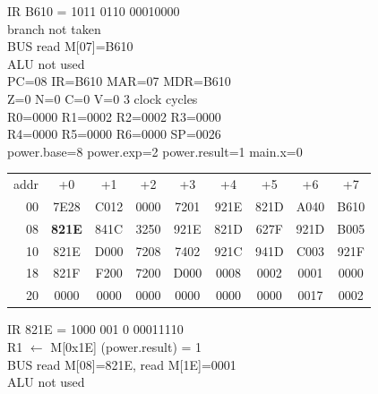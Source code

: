 \noindent\begin{tcolorbox}[stepbox, title={Step 12 \hfill PC 07 \quad BLE power.endwhile1}]
\textcolor{dim}{IR} B610 = 1011 0110 00010000\\
branch not taken\\
\textcolor{dim}{BUS} read M[07]=B610\\
\textcolor{dim}{ALU} \textcolor{dim}{not used}\\
PC=08 IR=B610 MAR=07 MDR=B610\\
Z=0 N=0 C=0 V=0 \hfill \textcolor{dim}{3 clock cycles}\\
R0=0000 R1=0002 R2=0002 R3=0000\\
R4=0000 R5=0000 R6=0000 SP=0026\\
\textcolor{dim}{power.base=8  power.exp=2  power.result=1  main.x=0}\\[1pt]
{\setlength{\tabcolsep}{1.6pt}\begin{tabular}{@{}r*{8}{c}@{}}
\textcolor{dim}{addr} & \textcolor{dim}{+0} & \textcolor{dim}{+1} & \textcolor{dim}{+2} & \textcolor{dim}{+3} & \textcolor{dim}{+4} & \textcolor{dim}{+5} & \textcolor{dim}{+6} & \textcolor{dim}{+7}\\
\textcolor{dim}{00} & 7E28 & C012 & 0000 & 7201 & 921E & 821D & A040 & B610\\
\textcolor{dim}{08} & \cellcolor{pcc}\textbf{821E} & 841C & 3250 & 921E & 821D & 627F & 921D & B005\\
\textcolor{dim}{10} & 821E & D000 & 7208 & 7402 & 921C & 941D & C003 & 921F\\
\textcolor{dim}{18} & 821F & F200 & 7200 & D000 & \cellcolor{datac}0008 & \cellcolor{datac}0002 & \cellcolor{datac}0001 & \cellcolor{datac}0000\\
\textcolor{dim}{20} & \cellcolor{stackc}0000 & \cellcolor{stackc}0000 & \cellcolor{stackc}0000 & \cellcolor{stackc}0000 & \cellcolor{stackc}0000 & \cellcolor{stackc}0000 & \cellcolor{stackc}0017 & \cellcolor{stackc}0002\\
\end{tabular}}
\end{tcolorbox}\hfill\begin{tcolorbox}[stepbox, title={Step 13 \hfill PC 08 \quad LD R1, power.result}]
\textcolor{dim}{IR} 821E = 1000 001 0 00011110\\
R1 $\leftarrow$ M[0x1E] (power.result) = 1\\
\textcolor{dim}{BUS} read M[08]=821E, read M[1E]=0001\\
\textcolor{dim}{ALU} \textcolor{dim}{not used}\\

\end{tcolorbox}
